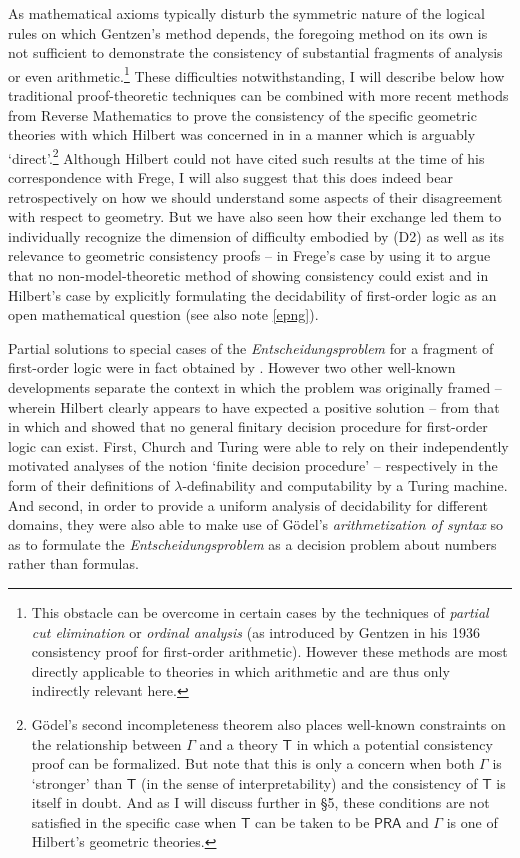 \documentclass[11pt,fleqn,leqno]{article}
\begin{document}
As mathematical axioms typically disturb the symmetric nature of the logical rules on which Gentzen's method depends, the foregoing method on its own is not sufficient to demonstrate the consistency of substantial fragments of analysis or even arithmetic.\footnote{This obstacle can be overcome in certain cases by the techniques of \textsl{partial cut elimination} or \textsl{ordinal analysis} (as introduced by Gentzen in his 1936 consistency proof for first-order arithmetic).  However these methods are most directly applicable to theories in which arithmetic and are thus only indirectly relevant here.}   These difficulties notwithstanding, I will describe below how traditional proof-theoretic techniques can be combined with more recent methods from Reverse Mathematics to prove the consistency of the specific geometric theories with which Hilbert was concerned in \citeyearpar{Hilbert1899} in a manner which is arguably `direct'.\footnote{G\"odel's second  incompleteness theorem also places well-known constraints on the relationship between $\Gamma$ and a theory $\mathsf{T}$ in which a potential consistency proof can be formalized.  But note that this is only a concern when both $\Gamma$ is `stronger' than $\mathsf{T}$ (in the sense of interpretability) and the consistency of $\mathsf{T}$ is itself in doubt.  And as I will discuss further in \S 5, these conditions are not satisfied in the specific case when $\mathsf{T}$ can be taken to be $\mathsf{PRA}$ and $\Gamma$ is one of Hilbert's geometric theories.}  Although Hilbert could not have cited such results at the time of his correspondence with Frege, I will also suggest that this does indeed bear retrospectively on how we should understand some aspects of their disagreement with respect to geometry.   But we have also seen how their exchange led them to individually recognize the dimension of difficulty embodied by (D2) as well as its relevance to geometric consistency proofs -- in Frege's case by using it to argue that no non-model-theoretic method of showing consistency could exist and in Hilbert's case by explicitly formulating the decidability of first-order logic as an open mathematical question (see also note \ref{epng}).

Partial solutions to special cases of the \textsl{Entscheidungsproblem} for a fragment of first-order logic were in fact obtained by \citet{Bernays1928c}.   However two other well-known developments separate the context in which the problem was originally framed -- wherein Hilbert clearly appears to have expected a positive solution -- from that in which \citet{Church1936a} and \citet{Turing1936} showed that no general finitary decision procedure for first-order logic can exist.  First, Church and Turing were able to rely on their independently motivated analyses of the notion `finite decision procedure'  -- respectively in the form of their definitions of $\lambda$-definability and computability by a Turing machine.  And second, in order to provide a uniform analysis of decidability for different domains, they were also able to make use of G\"odel's \citeyearpar{Godel1931a} \textsl{arithmetization of syntax} so as to formulate the \textsl{Entscheidungsproblem} as a decision problem about numbers rather than formulas.
\end{document}
